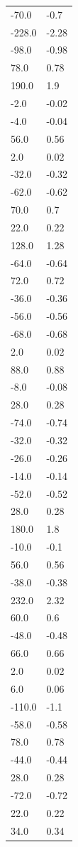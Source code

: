 \begin{longtable}{ll}
-70.0 & -0.7 \\
-228.0 & -2.28 \\
-98.0 & -0.98 \\
78.0 & 0.78 \\
190.0 & 1.9 \\
-2.0 & -0.02 \\
-4.0 & -0.04 \\
56.0 & 0.56 \\
2.0 & 0.02 \\
-32.0 & -0.32 \\
-62.0 & -0.62 \\
70.0 & 0.7 \\
22.0 & 0.22 \\
128.0 & 1.28 \\
-64.0 & -0.64 \\
72.0 & 0.72 \\
-36.0 & -0.36 \\
-56.0 & -0.56 \\
-68.0 & -0.68 \\
2.0 & 0.02 \\
88.0 & 0.88 \\
-8.0 & -0.08 \\
28.0 & 0.28 \\
-74.0 & -0.74 \\
-32.0 & -0.32 \\
-26.0 & -0.26 \\
-14.0 & -0.14 \\
-52.0 & -0.52 \\
28.0 & 0.28 \\
180.0 & 1.8 \\
-10.0 & -0.1 \\
56.0 & 0.56 \\
-38.0 & -0.38 \\
232.0 & 2.32 \\
60.0 & 0.6 \\
-48.0 & -0.48 \\
66.0 & 0.66 \\
2.0 & 0.02 \\
6.0 & 0.06 \\
-110.0 & -1.1 \\
-58.0 & -0.58 \\
78.0 & 0.78 \\
-44.0 & -0.44 \\
28.0 & 0.28 \\
-72.0 & -0.72 \\
22.0 & 0.22 \\
34.0 & 0.34 \\

\end{longtable}
